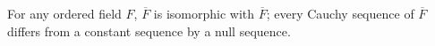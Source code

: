 For any ordered field $F$, $\overline{F}$ is isomorphic with $\overline{F}$; every Cauchy sequence of $\overline{F}$ differs from a constant sequence by a null sequence.
